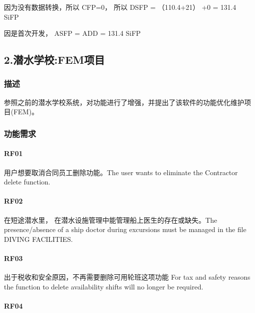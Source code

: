 因为没有数据转换，所以 CFP=0， 所以 DSFP = （110.4+21） +0 = 131.4 SiFP

因是首次开发， ASFP = ADD = 131.4 SiFP

\hypertarget{ux6f5cux6c34ux5b66ux6821femux9879ux76ee}{%
\subsection{2.潜水学校:FEM项目}\label{ux6f5cux6c34ux5b66ux6821femux9879ux76ee}}

\hypertarget{ux63cfux8ff0}{%
\subsubsection{描述}\label{ux63cfux8ff0}}

参照之前的潜水学校系统，对功能进行了增强，并提出了该软件的功能优化维护项目(FEM)。

\hypertarget{ux529fux80fdux9700ux6c42}{%
\subsubsection{功能需求}\label{ux529fux80fdux9700ux6c42}}

\hypertarget{rf01}{%
\paragraph{RF01}\label{rf01}}

用户想要取消合同员工删除功能。The user wants to eliminate the Contractor
delete function.

\hypertarget{rf02}{%
\paragraph{RF02}\label{rf02}}

在短途潜水里， 在潜水设施管理中能管理船上医生的存在或缺失。The
presence/absence of a ship doctor during excursions must be managed in
the file DIVING FACILITIES.

\hypertarget{rf03}{%
\paragraph{RF03}\label{rf03}}

出于税收和安全原因，不再需要删除可用轮班这项功能 For tax and safety
reasons the function to delete availability shifts will no longer be
required.

\hypertarget{rf04}{%
\paragraph{RF04}\label{rf04}}

